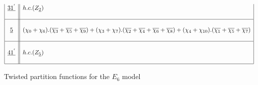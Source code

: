 \documentclass[a4paper,11pt]{article}
\newcommand{\ch}[1]{\chi_{#1}}
\newcommand{\och}[1]{\overline{\chi_{#1}}}
\newcommand{\ud}[1]{\underline{#1}}
\begin{document}
\begin{table}
$$\begin{array}{|c||l|}
\ud{31^{'}} & h.c. (Z_{\ud2}) \\
{}  &  {}  \\
\hline
{}  &  {}  \\
\ud5  & (\ch{0} + \ch{6}).(\och{3} + \och{5} + \och{9})
+  (\ch{3} + \ch{7}).(\och{2} + \och{4} + \och{6} + \och{8})
+  (\ch{4} + \ch{10}).(\och{1} + \och{5} + \och{7})  \\
{}  &  {}  \\
\hline
{}  &  {}  \\
\ud{41^{'}} & h.c. (Z_{\ud5}) \\
{}  &  {}  \\
\hline
\end{array}
$$
\normalsize
\caption{Twisted partition functions for the $E_6$ model}
\end{table}




\end{document}
